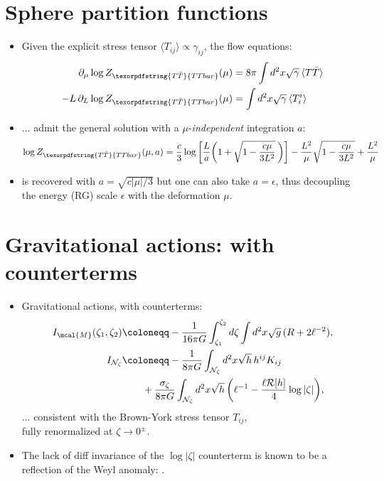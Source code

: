 \documentclass[10pt]{article}
\renewenvironment{frame}[1]%
	{\section*{#1}}%
	{\clearpage}
\newcommand{\TTbar}{\texorpdfstring{\ensuremath{T\bar{T}}}{TTbar}\xspace}
\begin{document}
\begin{frame}{Sphere partition functions}{%
	\textcite{Donnelly:2018bef,Li:2020zjb}
}

\begin{itemize}

\item Given the explicit stress tensor $\langle T_{ij}\rangle \propto \gamma_{ij}$, the flow equations:
	\begin{align*}
\partial_\mu \log Z_{\TTbar}(\mu)&=8\pi \int d^2x\sqrt{\gamma}\, \langle T\bar{T} \rangle \\
-L\,\partial_L \log Z_{\TTbar}(\mu)&=\int d^2x\sqrt{\gamma}\,\langle T^i_i \rangle
	\end{align*}

	\item ... admit the general solution with a $\mu$-\textit{independent} integration $a$:
	\begin{equation*}
		\log Z_{\TTbar}(\mu, a) = \frac{c}{3} \log \bigg[\frac{L}{a}   \bigg(1+\sqrt{1-\frac{c \mu }{3  L^2}}\, \bigg) \bigg] - \frac{L^2}{\mu}  \sqrt{1-\frac{c \mu }{3 L^2}} + \frac{L^2}{\mu} %
	\end{equation*}

	\item \textcite{Donnelly:2018bef} is recovered with $a = \sqrt{c|\mu|/3}$ but one can also take $a = \epsilon$, thus decoupling the energy (RG) scale $\epsilon$ with the deformation $\mu$. 
\end{itemize}
\end{frame}

\begin{frame}{Gravitational actions: with counterterms}{%
	\textcite{Donnelly:2018bef,Li:2020zjb}
}

\begin{itemize}

\item Gravitational actions, with counterterms:
	\begin{align*}
		I_{\mcal{M}}(\zeta_1, \zeta_2) & \coloneqq - \frac{1}{16\pi G} \int_{\zeta_1}^{\zeta_2} d\zeta \int d^2 x \sqrt{g} \, (R + 2 \ell^{-2}),  %
	\\
		I_{\mathcal N_{\zeta}} & \coloneqq  - \frac{1}{8\pi G} \int_{\mathcal N_{\zeta}} d^2x \sqrt{h}\,h^{ij} K_{ij} 
	\\& \qquad + \frac{\sigma_\zeta}{8\pi G} \int_{\mathcal N_{\zeta}} d^2x \sqrt{h} \, \bigg(\ell^{-1} - \frac{\ell  \mathcal{R}[h]}{4} \log |\zeta| \bigg), %
	\end{align*}
	... consistent with the Brown-York stress tensor $T_{ij}$, \\
	fully renormalized at $\zeta \to 0^\pm$. 
	
	\item The lack of diff invariance of the $\log |\zeta|$ counterterm is known to be a reflection of the Weyl anomaly: \textsl{\citeauthor{Henningson:1998gx,deHaro:2000vlm,Papadimitriou:2010as}}.
	
\end{itemize}

\end{frame}
\end{document}
